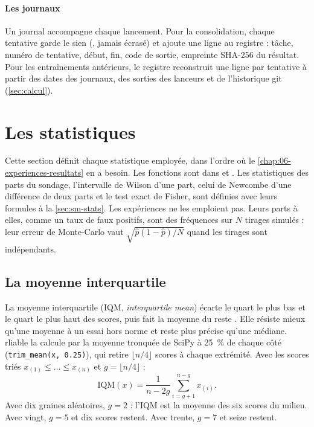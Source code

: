 \paragraph{Les journaux}
Un journal accompagne chaque lancement. Pour la consolidation, chaque tentative garde le sien
(, jamais écrasé) et ajoute une ligne au registre
 : tâche, numéro de tentative, début, fin, code de sortie, empreinte SHA-256 du
résultat. Pour les entraînements antérieurs, le registre  reconstruit une ligne
par tentative à partir des dates des journaux, des sorties des lanceurs et de l'historique git
(\cref{sec:calcul}).

\section{Les statistiques}\label{sec:statistiques}

Cette section définit chaque statistique employée, dans l'ordre où le \cref{chap:06-experiences-resultats} en
a besoin. Les fonctions sont dans
 et \allowbreak{}. Les statistiques des parts
du sondage, l'intervalle de Wilson d'une part, celui de Newcombe d'une différence de deux parts et le test exact
de Fisher, sont définies avec leurs formules à la \cref{sec:sm-stats}. Les expériences ne les emploient pas.
Leurs parts à elles, comme un taux de faux positifs, sont des fréquences sur $N$ tirages simulés : leur erreur
de Monte-Carlo vaut $\sqrt{\hat p(1-\hat p)/N}$ quand les tirages sont indépendants.

\subsection{La moyenne interquartile}\label{sec:iqm}
La moyenne interquartile (IQM, \emph{interquartile mean}) écarte le quart le plus bas et le quart le plus haut
des scores, puis fait la moyenne du reste \parencite{agarwal2021precipice}. Elle résiste mieux qu'une moyenne à
un essai hors norme et reste plus précise qu'une médiane. rliable la calcule par la moyenne tronquée de SciPy à
25~\% de chaque côté (\texttt{trim\_mean(x, 0.25)}), qui retire $\lfloor n/4\rfloor$ scores à chaque extrémité.
Avec les scores triés $x_{(1)}\le\dots\le x_{(n)}$ et $g=\lfloor n/4\rfloor$ :
\begin{equation}\label{eq:iqm}
  \mathrm{IQM}(x) = \frac{1}{n-2g}\sum_{i=g+1}^{n-g} x_{(i)} .
\end{equation}
Avec dix graines aléatoires, $g=2$ : l'IQM est la moyenne des six scores du milieu. Avec vingt, $g=5$ et dix
scores restent. Avec trente, $g=7$ et seize restent.

